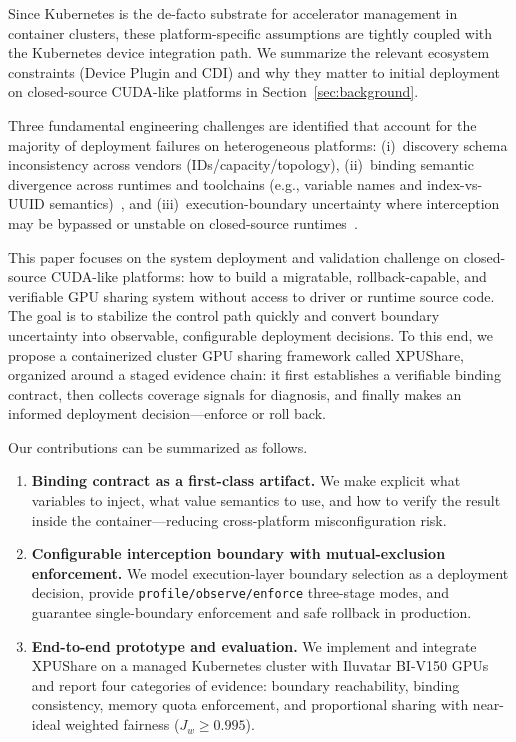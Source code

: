 \documentclass[runningheads,a4paper]{llncs}
\begin{document}
Since Kubernetes is the de-facto substrate for accelerator management in
container clusters, these platform-specific assumptions are tightly
coupled with the Kubernetes device integration path. We summarize the
relevant ecosystem constraints (Device Plugin and CDI) and why they
matter to initial deployment on closed-source CUDA-like platforms in
Section~\ref{sec:background}.

Three fundamental engineering challenges are identified that account for the
majority of deployment failures on heterogeneous platforms: (i)~discovery
schema inconsistency across vendors (IDs/capacity/topology), (ii)~binding
semantic divergence across runtimes and toolchains (e.g., variable names and
index-vs-UUID semantics)~\cite{cdi,deepspark-toolkit},
and (iii)~execution-boundary uncertainty where interception may be
bypassed or unstable on closed-source runtimes~\cite{cuda-interception}.

This paper focuses on the system deployment and validation challenge on
closed-source CUDA-like platforms: how to build a migratable,
rollback-capable, and verifiable GPU sharing system without access to driver
or runtime source code. The goal is to stabilize the control path quickly
and convert boundary uncertainty into observable, configurable deployment
decisions. To this end, we propose a containerized cluster GPU sharing framework called XPUShare, organized around a staged
evidence chain: it first establishes a verifiable binding contract, then collects coverage signals for diagnosis, and finally makes an informed deployment decision---enforce or roll back.

Our contributions can be summarized as follows.
\begin{enumerate}
\item \textbf{Binding contract as a first-class artifact.} We make
explicit what variables to inject, what value semantics to use, and how to
verify the result inside the container---reducing cross-platform
misconfiguration risk.

\item \textbf{Configurable interception boundary with mutual-exclusion
enforcement.} We model execution-layer boundary selection as a deployment
decision, provide \texttt{profile/observe/enforce} three-stage modes, and guarantee
single-boundary enforcement and safe rollback in production.

\item \textbf{End-to-end prototype and evaluation.} We implement and
integrate XPUShare on a managed Kubernetes cluster with Iluvatar BI-V150
GPUs and report four categories of evidence: boundary reachability,
binding consistency, memory quota enforcement, and proportional sharing
with near-ideal weighted fairness ($J_w{\geq}0.995$).
\end{enumerate}
\end{document}

